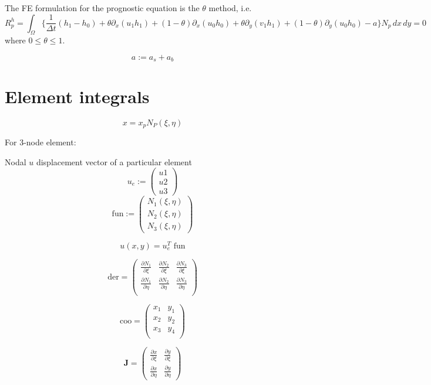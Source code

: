 \documentclass[10pt,a4paper]{book}
\newcommand{\p}{\partial}
\begin{document}
The FE formulation for the prognostic equation is the $\theta$ method, i.e.\
\begin{equation}
R_p^h= \int_{\Omega} \{ \frac{1}{\Delta t} ( h_1 - h_0) 
+ \theta \p_x (u_1 h_1 ) +  (1-\theta) \p_x (u_0 h_0) 
+ \theta \p_y (v_1 h_1 ) +  (1-\theta) \p_y (u_0 h_0) 
-a \} N_p \, dx \, dy=0
\label{eq:rph2d}
\end{equation}
where $0\le \theta \le 1$.

\[ 
a:=a_s+a_b
\]

\section{Element integrals}

\[ x=x_p N_P(\xi,\eta) \]

For 3-node element:

Nodal $u$ displacement vector of a particular element
\[
u_e:=
\begin{pmatrix} u1 \\  u2 \\  u3 \end{pmatrix}
\]
\[
\text{fun}:=
\begin{pmatrix} N_1(\xi,\eta) \\ N_2(\xi,\eta) \\ N_3(\xi,\eta) \end{pmatrix}
\]


\[
u(x,y)=u_e^T \text{ fun}
\]



\[
\text{der}=
\begin{pmatrix}
\frac{ \p N_1}{\p \xi}   & \frac{ \p N_2}{\p \xi}  & \frac{ \p N_3}{\p \xi} \\
\frac{ \p N_1}{\p \eta}  & \frac{ \p N_2}{\p \eta}  & \frac{ \p N_3}{\p \eta} \\
\end{pmatrix}
\]

\[
\text{coo}=
\begin{pmatrix}
x_1   & y_1 \\
x_2   & y_2 \\
x_3   & y_4 \\
\end{pmatrix}
\]


\[
\bm{J}=
\begin{pmatrix}
\frac{\p x}{\p \xi}  &  \frac{\p y}{\p \xi}  \\ 
\frac{\p x}{\p \eta} &  \frac{\p y}{\p \eta}  
\end{pmatrix}
\]
\end{document}
